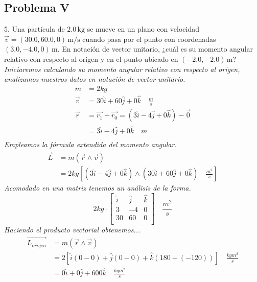 \documentclass{article}
\begin{document}
\subsection*{Problema V}
5. Una partícula de \(2.0\,\text{kg}\) se mueve en un plano con velocidad \(\vec{v} = (30.0,60.0,0)\,\text{m/s}\) cuando pasa por el punto con coordenadas \((3.0,-4.0,0)\,\text{m}\). En notación de vector unitario, ¿cuál es su momento angular relativo con respecto al origen y en el punto ubicado en \((-2.0,-2.0)\,\text{m}\)?
\textit{Iniciaremos calculando su momento angular relativo con respecto al origen, analizamos nuestros datos en notación de vector unitario.}
\begin{align*}
    m &= 2kg \\
    \vec{v} &= 30\hat{i} + 60\hat{j} + 0\hat{k} \quad \frac{m}{s} \\
    \vec{r} &= \vec{r_1} - \vec{r_0} = (3\hat{i} - 4\hat{j} + 0\hat{k}) - \vec{0} \\ 
    &= 3\hat{i} - 4\hat{j} + 0\hat{k} \quad m\\
\end{align*}
\textit{Empleamos la fórmula extendida del momento angular.}
\begin{align*}
    \vec{L} &= m(\vec{r} \land \vec{v}) \\
&= 2kg\left[(3\hat{i} - 4\hat{j} + 0\hat{k}) \land (30\hat{i} + 60\hat{j} + 0\hat{k} ) \quad \frac{m^2}{s} \right]
\end{align*}
\textit{Acomodado en una matriz tenemos un análisis de la forma.}
$$ 2kg \cdot \begin{bmatrix}
    \hat{i} & \hat{j} & \hat{k} \\
    3 & -4 & 0 \\
    30 & 60 & 0 \\
    \end{bmatrix} \quad \frac{m^2}{s}$$
\textit{Haciendo el producto vectorial obtenemos...}
\begin{align*}
    \vec{L_{origen}} &= m(\vec{r} \land \vec{v}) \\
&= 2[\hat{i}(0-0) + \hat{j}(0-0) + \hat{k}(180-(-120))] \quad \frac{kgm^2}{s} \\
&= 0\hat{i} + 0\hat{j} + 600\hat{k} \quad \frac{kgm^2}{s}
\end{align*}
\end{document}
